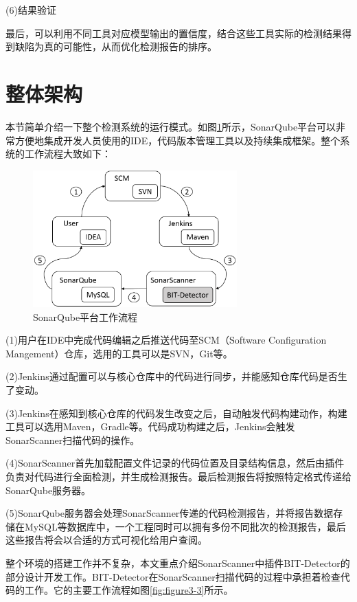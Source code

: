 (6)结果验证

最后，可以利用不同工具对应模型输出的置信度，结合这些工具实际的检测结果得到缺陷为真的可能性，从而优化检测报告的排序。

\section{整体架构}

本节简单介绍一下整个检测系统的运行模式。如图\ref{fig:figure3-2}所示，SonarQube平台可以非常方便地集成开发人员使用的IDE，代码版本管理工具以及持续集成框架。整个系统的工作流程大致如下：

\begin{figure}
	\centering
	\includegraphics[width=0.70\textwidth]{figures/sonarqube3-2}
	\caption{SonarQube平台工作流程}\label{fig:figure3-2}
\end{figure}


(1)用户在IDE中完成代码编辑之后推送代码至SCM（Software Configuration Mangement）仓库，选用的工具可以是SVN，Git等。

(2)Jenkins通过配置可以与核心仓库中的代码进行同步，并能感知仓库代码是否生了变动。

(3)Jenkins在感知到核心仓库的代码发生改变之后，自动触发代码构建动作，构建工具可以选用Maven，Gradle等。代码成功构建之后，Jenkins会触发SonarScanner扫描代码的操作。

(4)SonarScanner首先加载配置文件记录的代码位置及目录结构信息，然后由插件负责对代码进行全面检测，并生成检测报告。最后检测报告将按照特定格式传递给SonarQube服务器。

(5)SonarQube服务器会处理SonarScanner传递的代码检测报告，并将报告数据存储在MySQL等数据库中，一个工程同时可以拥有多份不同批次的检测报告，最后这些报告将会以合适的方式可视化给用户查阅。

整个环境的搭建工作并不复杂，本文重点介绍SonarScanner中插件BIT-Detector的部分设计开发工作。BIT-Detector在SonarScanner扫描代码的过程中承担着检查代码的工作。它的主要工作流程如图\ref{fig:figure3-3}所示。

